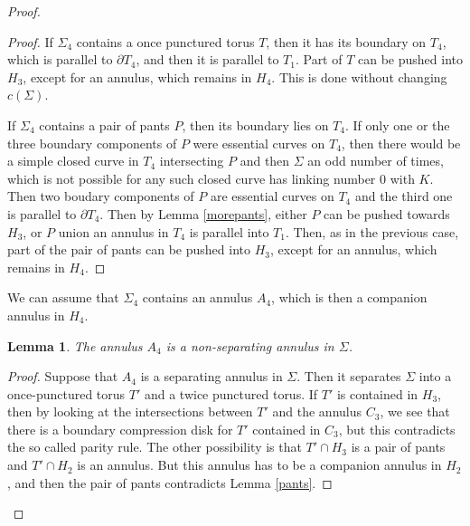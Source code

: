 \documentclass[12pt]{amsart}
\newtheorem{lema}{Lemma}
\begin{document}
\begin{proof}
\begin{proof} If $\Sigma_4$ contains a once punctured torus $T$, then it has its boundary on $T_4$, which is parallel to $\partial T_4$, and then it is parallel to $T_1$. Part of $T$ can be pushed into $H_3$, except for an annulus, which remains in $H_4$. This is done without changing $c(\Sigma)$.

If $\Sigma_4$ contains a pair of pants $P$, then its boundary lies on $T_4$. If only one or the three boundary components of $P$ were essential curves on $T_4$, then there would be a simple closed curve in $T_4$ intersecting $P$ and then $\Sigma$ an odd number of times, which is not possible for any such closed curve has linking number $0$ with $K$. Then two boudary components of $P$ are essential curves on $T_4$ and the third one is parallel to $\partial T_4$. Then by Lemma \ref{morepants}, either $P$ can be pushed towards $H_3$, or $P$ union an annulus in $T_4$ is parallel into $T_1$. Then, as in the previous case, part of the pair of pants can be pushed into $H_3$, except for an annulus, which remains in $H_4$.
\end{proof}

We can assume that $\Sigma_4$ contains an annulus $A_4$, which is then a companion annulus in $H_4$.

\begin{lema} The annulus $A_4$ is a non-separating annulus in $\Sigma$.
\end{lema}

\begin{proof} Suppose that $A_4$ is a separating annulus in $\Sigma$. Then it separates $\Sigma$ into a once-punctured torus $T'$ and a twice punctured torus. If $T'$ is contained in $H_3$, then by looking at the intersections between $T'$ and the annulus $C_3$, we see that there is a boundary compression disk for $T'$ contained in $C_3$, but this contradicts the so called parity rule. The other possibility is that $T'\cap H_3$ is a pair of pants and $T'\cap H_2$ is an annulus. But this annulus has to be a companion annulus in $H_2$, and then the pair of pants contradicts Lemma \ref{pants}.
\end{proof}





\end{proof}
\end{document}
